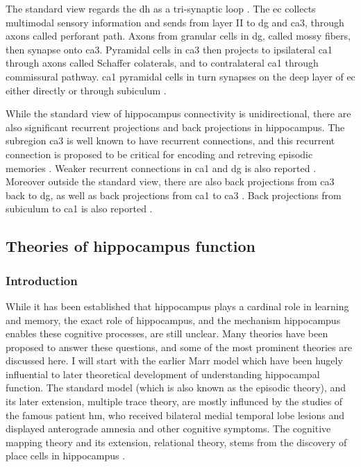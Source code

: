 The standard view regards the \gls{dh} as a tri-synaptic loop \citep{strien09}. The \gls{ec} collects multimodal sensory information and sends from layer II to \gls{dg} and \gls{ca3}, through axons called perforant path. Axons from granular cells in \gls{dg}, called mossy fibers, then synapse onto \gls{ca3}. Pyramidal cells in \gls{ca3} then projects to ipsilateral \gls{ca1} through axons called Schaffer colaterals, and to contralateral \gls{ca1} through commissural pathway. \gls{ca1} pyramidal cells in turn synapses on the deep layer of \gls{ec} either directly or through subiculum \citep{strien09}.

While the standard view of hippocampus connectivity is unidirectional, there are also significant recurrent projections and back projections in hippocampus. The subregion \gls{ca3} is well known to have recurrent connections, and this recurrent connection is proposed to be critical for encoding and retreving episodic memories \citep{nakazawa02, rolls07}. Weaker recurrent connections in \gls{ca1} and \gls{dg} is also reported \citep{swanson81, ishizuka90, buckmaster93}. Moreover outside the standard view, there are also back projections from \gls{ca3} back to \gls{dg}, as well as back projections from \gls{ca1} to \gls{ca3} \citep{swanson81, li94}. Back projections from subiculum to \gls{ca1} is also reported \citep{finch83}. 

\subsection{Theories of hippocampus function}
\subsubsection{Introduction}
While it has been established that hippocampus plays a cardinal role in learning and memory, the exact role of hippocampus, and the mechanism hippocampus enables these cognitive processes, are still unclear. Many theories have been proposed to answer these questions, and some of the most prominent theories are discussed here. I will start with the earlier Marr model \citep{marr71} which have been hugely influential to later theoretical development of understanding hippocampal function. The standard model (which is also known as the episodic theory), and its later extension, multiple trace theory, are mostly influnced by the studies of the famous patient \gls{hm}, who received bilateral medial temporal lobe lesions and displayed anterograde amnesia and other cognitive symptoms. The cognitive mapping theory and its extension, relational theory, stems from the discovery of place cells in hippocampus \citep{o'keefe71}. 

